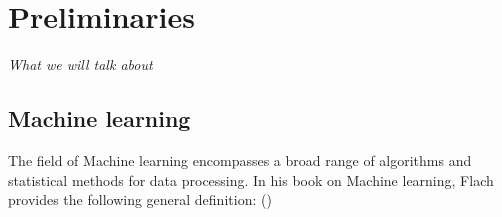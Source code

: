 \chapter{Preliminaries}

\textit{What we will talk about}

\section{Machine learning}
The field of Machine learning encompasses a broad range of algorithms and statistical methods for data processing. In his book on Machine learning, Flach provides the following general definition:  (\citet{Flach:2012:MLA:2490546})